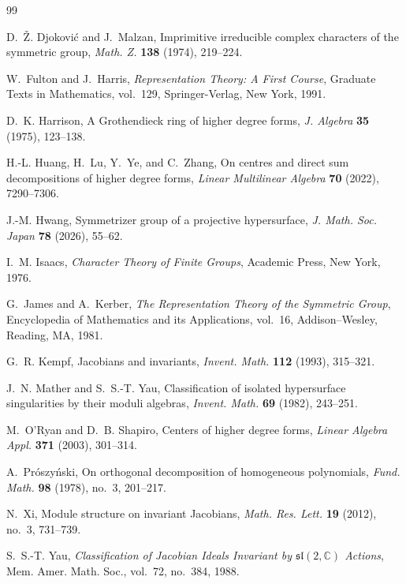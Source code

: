 \documentclass[11pt,reqno]{amsart}
\numberwithin{equation}{section}
\theoremstyle{definition}
\theoremstyle{remark}
\newcommand{\C}{\mathbb C}
\begin{document}
\begin{thebibliography}{99}

D.~\v{Z}. Djokovi\'c and J.~Malzan,
\newblock Imprimitive irreducible complex characters of the symmetric
group,
\newblock \emph{Math. Z.} \textbf{138} (1974), 219--224.

W.~Fulton and J.~Harris,
\newblock \emph{Representation Theory: A First Course},
\newblock Graduate Texts in Mathematics, vol.~129,
Springer-Verlag, New York, 1991.

D.~K. Harrison,
\newblock A Grothendieck ring of higher degree forms,
\newblock \emph{J. Algebra} \textbf{35} (1975), 123--138.


H.-L. Huang, H.~Lu, Y.~Ye, and C.~Zhang,
\newblock On centres and direct sum decompositions of higher degree
forms,
\newblock \emph{Linear Multilinear Algebra} \textbf{70} (2022),
7290--7306.

J.-M. Hwang,
\newblock Symmetrizer group of a projective hypersurface,
\newblock \emph{J. Math. Soc. Japan} \textbf{78} (2026), 55--62.

I.~M. Isaacs,
\newblock \emph{Character Theory of Finite Groups},
\newblock Academic Press, New York, 1976.

G.~James and A.~Kerber,
\newblock \emph{The Representation Theory of the Symmetric Group},
\newblock Encyclopedia of Mathematics and its Applications, vol.~16,
Addison--Wesley, Reading, MA, 1981.

G.~R. Kempf,
\newblock Jacobians and invariants,
\newblock \emph{Invent. Math.} \textbf{112} (1993), 315--321.


J.~N. Mather and S.~S.-T. Yau,
\newblock Classification of isolated hypersurface singularities by
their moduli algebras,
\newblock \emph{Invent. Math.} \textbf{69} (1982), 243--251.

M.~O'Ryan and D.~B. Shapiro,
\newblock Centers of higher degree forms,
\newblock \emph{Linear Algebra Appl.} \textbf{371} (2003), 301--314.

A.~Pr{\'o}szy{\'n}ski,
\newblock On orthogonal decomposition of homogeneous polynomials,
\newblock \emph{Fund. Math.} \textbf{98} (1978), no.~3, 201--217.

N.~Xi,
\newblock Module structure on invariant Jacobians,
\newblock \emph{Math. Res. Lett.} \textbf{19} (2012), no.~3,
731--739.

S.~S.-T. Yau,
\newblock \emph{Classification of Jacobian Ideals Invariant by
$\mathfrak{sl}(2,\C)$ Actions},
\newblock Mem. Amer. Math. Soc., vol.~72, no.~384, 1988.

\end{thebibliography}
\end{document}
